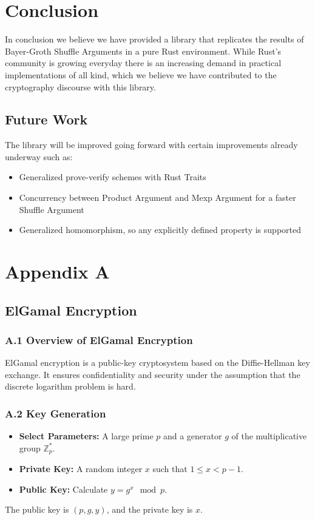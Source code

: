 \documentclass[12pt,a4paper]{report}
\begin{document}
\chapter{Conclusion}
In conclusion we believe we have provided a library that replicates the results of Bayer-Groth Shuffle Arguments in a pure Rust environment. 
While Rust's community is growing everyday there is an increasing demand in practical implementations of all kind, which we believe we have contributed to the cryptography discourse with this library.

\section{Future Work}
The library will be improved going forward with certain improvements already underway such as:
\begin{itemize}
	\item Generalized prove-verify schemes with Rust Traits
	\item Concurrency between Product Argument and Mexp Argument for a faster Shuffle Argument
	\item Generalized homomorphism, so any explicitly defined property is supported
\end{itemize}

\newpage
{}



\appendix
\chapter{Appendix A}
\section{ElGamal Encryption}

\subsection{A.1 Overview of ElGamal Encryption}
ElGamal encryption is a public-key cryptosystem based on the Diffie-Hellman key exchange. It ensures confidentiality and security under the assumption that the discrete logarithm problem is hard.

\subsection{A.2 Key Generation}
\begin{itemize}
    \item \textbf{Select Parameters:} A large prime \( p \) and a generator \( g \) of the multiplicative group \( \mathbb{Z}_p^* \).
    \item \textbf{Private Key:} A random integer \( x \) such that \( 1 \leq x < p-1 \).
    \item \textbf{Public Key:} Calculate \( y = g^x \mod p \).
\end{itemize}
The public key is \( (p, g, y) \), and the private key is \( x \).
\end{document}
